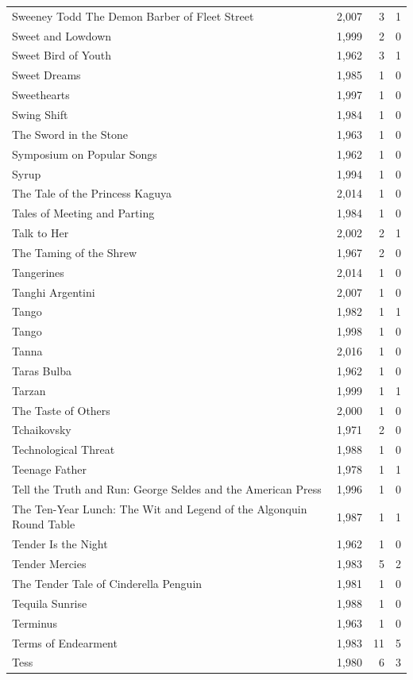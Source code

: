 \begin{tabular}{lrrr}
Sweeney Todd The Demon Barber of Fleet Street & 2,007 & 3 & 1 \\
Sweet and Lowdown & 1,999 & 2 & 0 \\
Sweet Bird of Youth & 1,962 & 3 & 1 \\
Sweet Dreams & 1,985 & 1 & 0 \\
Sweethearts & 1,997 & 1 & 0 \\
Swing Shift & 1,984 & 1 & 0 \\
The Sword in the Stone & 1,963 & 1 & 0 \\
Symposium on Popular Songs & 1,962 & 1 & 0 \\
Syrup & 1,994 & 1 & 0 \\
The Tale of the Princess Kaguya & 2,014 & 1 & 0 \\
Tales of Meeting and Parting & 1,984 & 1 & 0 \\
Talk to Her & 2,002 & 2 & 1 \\
The Taming of the Shrew & 1,967 & 2 & 0 \\
Tangerines & 2,014 & 1 & 0 \\
Tanghi Argentini & 2,007 & 1 & 0 \\
Tango & 1,982 & 1 & 1 \\
Tango & 1,998 & 1 & 0 \\
Tanna & 2,016 & 1 & 0 \\
Taras Bulba & 1,962 & 1 & 0 \\
Tarzan & 1,999 & 1 & 1 \\
The Taste of Others & 2,000 & 1 & 0 \\
Tchaikovsky & 1,971 & 2 & 0 \\
Technological Threat & 1,988 & 1 & 0 \\
Teenage Father & 1,978 & 1 & 1 \\
Tell the Truth and Run: George Seldes and the American Press & 1,996 & 1 & 0 \\
The Ten-Year Lunch: The Wit and Legend of the Algonquin Round Table & 1,987 & 1 & 1 \\
Tender Is the Night & 1,962 & 1 & 0 \\
Tender Mercies & 1,983 & 5 & 2 \\
The Tender Tale of Cinderella Penguin & 1,981 & 1 & 0 \\
Tequila Sunrise & 1,988 & 1 & 0 \\
Terminus & 1,963 & 1 & 0 \\
Terms of Endearment & 1,983 & 11 & 5 \\
Tess & 1,980 & 6 & 3 \\

\end{tabular}
